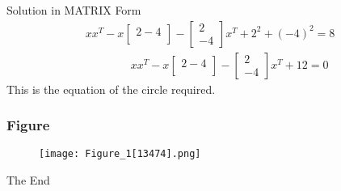 \documentclass{beamer}
\begin{document}
\begin{frame}{Solution in MATRIX Form}
\begin{equation*}
\begin{aligned}
xx^{T} - x \left[\begin{array}{ c }
     2 -4\\
  \end{array} \right]
  -  \left[
  \begin{array}{ c }
     2\\
    -4
  \end{array} \right]x^{T} + 2^2 + (-4)^{2} = 8\\
\qquad \qquad xx^{T} - x \left[\begin{array}{ c }
     2 -4\\
  \end{array} \right]
  -  \left[
  \begin{array}{ c }
     2\\
    -4
  \end{array} \right]x^{T} + 12 = 0
  \end{aligned}
\end{equation*}
\centering
This is the equation of the circle required.
 
 
 
\end{frame}



\begin{frame}
\frametitle{Figure}
\begin{figure}
\texttt{[image: Figure\_1[13474].png]}
\end{figure}
\end{frame}





\begin{frame}
\Huge{\centerline{The End}}
\end{frame}

\end{document}
